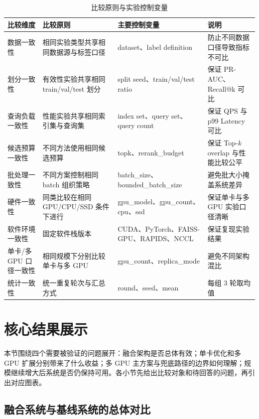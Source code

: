 \begin{table}[htbp]
  \caption{比较原则与实验控制变量}
  \label{tab:fairness-controls}
  \centering
  \small
  \renewcommand{\arraystretch}{1.15}
  \begin{adjustbox}{max width=\linewidth}
  \begin{tabular}{P{2.2cm}P{4.0cm}P{4.6cm}P{3.5cm}}
    \toprule
    比较维度 & 比较原则 & 主要控制变量 & 说明 \\
    \midrule
    数据一致性 & 相同实验类型共享相同数据源与标签口径 & dataset、label definition & 防止不同数据口径导致指标不可比 \\
    划分一致性 & 有效性实验共享相同 train/val/test 划分 & split seed、train/val/test ratio & 保证 PR-AUC、Recall@k 可比 \\
    查询负载一致性 & 性能实验共享相同索引集与查询集 & index set、query set、query count & 保证 QPS 与 p99 Latency 可比 \\
    候选预算一致性 & 不同方法使用相同候选预算 & topk、rerank\_budget & 保证 Top-$k$ overlap 与性能比较公平 \\
    批处理一致性 & 不同方案控制相同 batch 组织策略 & batch\_size、bounded\_batch\_size & 避免批大小掩盖系统差异 \\
    硬件一致性 & 同类比较在相同 GPU/CPU/SSD 条件下进行 & gpu\_model、gpu\_count、cpu、ssd & 保证单卡与多 GPU 实验口径清晰 \\
    软件环境一致性 & 固定软件栈版本 & CUDA、PyTorch、FAISS-GPU、RAPIDS、NCCL & 保证复现实验结果 \\
    单卡/多 GPU 口径一致性 & 相同规模下分别比较单卡与多 GPU & gpu\_count、replica\_mode & 避免不同架构混比 \\
    统计一致性 & 统一重复轮次与汇总方式 & round、seed、mean & 每组 3 轮取均值 \\
    \bottomrule
  \end{tabular}
  \end{adjustbox}
\end{table}

\section{核心结果展示}

本节围绕四个需要被验证的问题展开：融合架构是否总体有效；单卡优化和多 GPU 扩展分别带来了什么收益；多 GPU 主方案与兜底路径的边界如何理解；规模继续增大后系统是否仍保持可用。各小节先给出比较对象和待回答的问题，再引出对应图表。

\subsection{融合系统与基线系统的总体对比}

